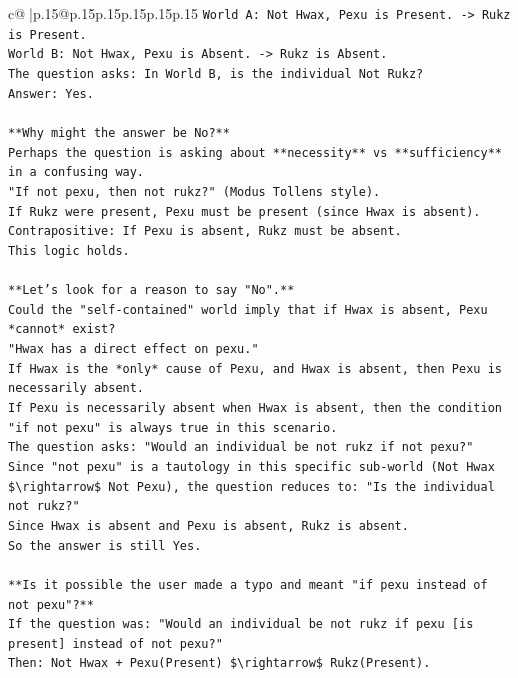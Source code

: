\documentclass{article}
\begin{document}
{\begin{supertabular}{c@{$\;$}|p{.15\linewidth}@{}p{.15\linewidth}p{.15\linewidth}p{.15\linewidth}p{.15\linewidth}p{.15\linewidth}}
{{{\texttt{World A: Not Hwax, Pexu is Present. {-}> Rukz is Present.} \\
\texttt{World B: Not Hwax, Pexu is Absent. {-}> Rukz is Absent.} \\
\texttt{The question asks: In World B, is the individual Not Rukz?} \\
\texttt{Answer: Yes.} \\
\\ 
\texttt{**Why might the answer be No?**} \\
\texttt{Perhaps the question is asking about **necessity** vs **sufficiency** in a confusing way.} \\
\texttt{"If not pexu, then not rukz?" (Modus Tollens style).} \\
\texttt{If Rukz were present, Pexu must be present (since Hwax is absent).} \\
\texttt{Contrapositive: If Pexu is absent, Rukz must be absent.} \\
\texttt{This logic holds.} \\
\\ 
\texttt{**Let's look for a reason to say "No".**} \\
\texttt{Could the "self{-}contained" world imply that if Hwax is absent, Pexu *cannot* exist?} \\
\texttt{"Hwax has a direct effect on pexu."} \\
\texttt{If Hwax is the *only* cause of Pexu, and Hwax is absent, then Pexu is necessarily absent.} \\
\texttt{If Pexu is necessarily absent when Hwax is absent, then the condition "if not pexu" is always true in this scenario.} \\
\texttt{The question asks: "Would an individual be not rukz if not pexu?"} \\
\texttt{Since "not pexu" is a tautology in this specific sub{-}world (Not Hwax \$\textbackslash{}rightarrow\$ Not Pexu), the question reduces to: "Is the individual not rukz?"} \\
\texttt{Since Hwax is absent and Pexu is absent, Rukz is absent.} \\
\texttt{So the answer is still Yes.} \\
\\ 
\texttt{**Is it possible the user made a typo and meant "if pexu instead of not pexu"?**} \\
\texttt{If the question was: "Would an individual be not rukz if pexu {[}is present{]} instead of not pexu?"} \\
\texttt{Then: Not Hwax + Pexu(Present) \$\textbackslash{}rightarrow\$ Rukz(Present).} \\
}}}
\end{supertabular}}
\end{document}
